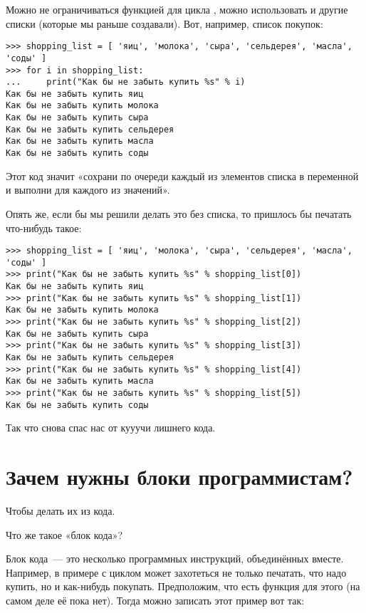 Можно не ограничиваться функцией  для цикла , можно использовать и другие списки (которые мы раньше создавали). Вот, например, список покупок:

\begin{listing}
\begin{verbatim}
>>> shopping_list = [ 'яиц', 'молока', 'сыра', 'сельдерея', 'масла', 'соды' ]
>>> for i in shopping_list:
...     print("Как бы не забыть купить %s" % i)
Как бы не забыть купить яиц
Как бы не забыть купить молока
Как бы не забыть купить сыра
Как бы не забыть купить сельдерея
Как бы не забыть купить масла
Как бы не забыть купить соды
\end{verbatim}
\end{listing}

Этот код значит «сохрани по очереди каждый из элементов списка в переменной  и выполни  для каждого из значений».

Опять же, если бы мы решили делать это без списка, то пришлось бы печатать что-нибудь такое:

\begin{listing}
\begin{verbatim}
>>> shopping_list = [ 'яиц', 'молока', 'сыра', 'сельдерея', 'масла', 'соды' ]
>>> print("Как бы не забыть купить %s" % shopping_list[0])
Как бы не забыть купить яиц
>>> print("Как бы не забыть купить %s" % shopping_list[1])
Как бы не забыть купить молока
>>> print("Как бы не забыть купить %s" % shopping_list[2])
Как бы не забыть купить сыра
>>> print("Как бы не забыть купить %s" % shopping_list[3])
Как бы не забыть купить сельдерея
>>> print("Как бы не забыть купить %s" % shopping_list[4])
Как бы не забыть купить масла
>>> print("Как бы не забыть купить %s" % shopping_list[5])
Как бы не забыть купить соды
\end{verbatim}
\end{listing}

Так что  снова спас нас от кууучи лишнего кода.

\section{Зачем нужны блоки программистам?}

Чтобы делать их из кода.

Что же такое «блок кода»?

Блок кода — это несколько программных инструкций, объединённых вместе. Например, в примере с циклом  может захотеться не только печатать, что надо купить, но и как-нибудь покупать. Предположим, что есть функция  для этого (на самом деле её пока нет). Тогда можно записать этот пример вот так:

